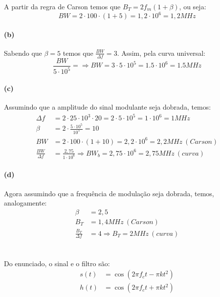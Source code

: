 A partir da regra de Carson temos que $B_T = 2f_m(1+\beta)$, ou seja:
$$
    BW = 2\cdot 100 \cdot (1 + 5) = 1,2 \cdot 10^6 = 1,2 MHz
$$

\paragraph{(b)}
Sabendo que $\beta = 5$ temos que $\frac{BW}{\Delta f} = 3$. Assim, pela curva universal:
$$
    \frac{BW}{5 \cdot 10^5} = \Rightarrow BW = 3 \cdot 5 \cdot 10^5 = 1.5 \cdot 10^6 = 1.5 MHz
$$

\paragraph{(c)}

Assumindo que a amplitude do sinal modulante seja dobrada, temos:
\begin{align*}
    \Delta f &= 2 \cdot 25 \cdot 10^3 \cdot 20 = 2 \cdot 5 \cdot 10^5 = 1\cdot10^6 = 1MHz\\
    \beta &= 2\cdot \frac{5 \cdot 10^5}{10^5} = 10\\
    BW &= 2\cdot 100 \cdot (1 + 10) = 2,2 \cdot 10^6 = 2,2 MHz ~(Carson)\\
    \frac{BW}{\Delta f} &= \frac{2,75}{1 \cdot 10^6} \Rightarrow BW_b = 2,75 \cdot 10^6 = 2,75 MHz ~(curva)
\end{align*}

\paragraph{(d)}
Agora assumindo que a frequência de modulação seja dobrada, temos, analogamente:
\begin{align*}
    \beta &= 2,5\\
    B_T &= 1,4 MHz ~(Carson)\\
    \frac{B_T}{\Delta f} &= 4 \Rightarrow B_T = 2MHz ~(curva)
\end{align*}

\section{}
\section{}

Do enunciado, o sinal e o filtro são:
\begin{align*}
    s(t) &= \cos(2\pi f_c t - \pi kt^2)\\
    h(t) &= \cos(2\pi f_c t + \pi kt^2)
\end{align*}

